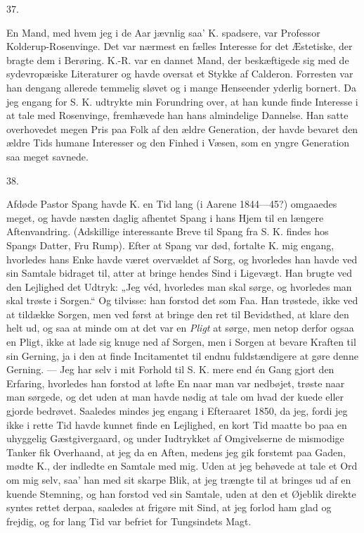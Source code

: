 \documentclass[12pt,a4paper,openany]{book}
\newcommand{\secnum}[1]{\par\begin{center}#1\end{center}\par\nobreak}
\newcommand{\opage}[1]{\marginnote{\footnotesize\textit{[#1]}}}
\begin{document}
\secnum{37.}

En Mand, med hvem jeg i de Aar jævnlig saa’ K.
spadsere, var Professor Kolderup-Rosenvinge. Det var
nærmest en fælles Interesse for det Æstetiske, der bragte
dem i Berøring. K.-R. var en dannet Mand, der beskæftigede
sig med de sydevropæiske Literaturer og havde
oversat et Stykke af Calderon. Forresten var han dengang
allerede temmelig sløvet og i mange Henseender
yderlig bornert. Da jeg engang for S. K. udtrykte min
Forundring over, at han kunde finde Interesse i at tale
med Rosenvinge, fremhævede han hans almindelige Dannelse.
Han satte overhovedet megen Pris paa Folk af
den ældre Generation, der havde bevaret den ældre Tids
humane Interesser og den Finhed i Væsen, som en yngre
Generation saa meget savnede.

\secnum{38.}

Afdøde Pastor Spang havde K. en Tid lang (i Aarene
1844—45?) omgaaedes meget, og havde næsten daglig
afhentet Spang i hans Hjem til en længere Aftenvandring.
(Adskillige interessante Breve til Spang fra S. K. findes
hos Spangs Datter, Fru Rump). Efter at Spang var død,
fortalte K. mig engang, hvorledes hans Enke havde været
overvældet af Sorg, og hvorledes han havde ved sin
\opage{364}Samtale bidraget til, atter at bringe hendes Sind i Ligevægt.
Han brugte ved den Lejlighed det Udtryk: „Jeg
véd, hvorledes man skal sørge, og hvorledes man skal
trøste i Sorgen.“ Og tilvisse: han forstod det som Faa.
Han trøstede, ikke ved at tildække Sorgen, men ved
først at bringe den ret til Bevidsthed, at klare den helt
ud, og saa at minde om at det var en \emph{Pligt} at sørge,
men netop derfor ogsaa en Pligt, ikke at lade sig knuge
ned af Sorgen, men i Sorgen at bevare Kraften til sin
Gerning, ja i den at finde Incitamentet til endnu fuldstændigere
at gøre denne Gerning. — Jeg har selv i mit
Forhold til S. K. mere end én Gang gjort den Erfaring,
hvorledes han forstod at løfte En naar man var nedbøjet,
trøste naar man sørgede, og det uden at man havde
nødig at tale om hvad der kuede eller gjorde bedrøvet.
Saaledes mindes jeg engang i Efteraaret 1850, da jeg,
fordi jeg ikke i rette Tid havde kunnet finde en Lejlighed,
en kort Tid maatte bo paa en uhyggelig Gæstgivergaard,
og under Iudtrykket af Omgivelserne de mismodige Tanker
fik Overhaand, at jeg da en Aften, medens jeg gik forstemt
paa Gaden, mødte K., der indledte en Samtale
med mig. Uden at jeg behøvede at tale et Ord om mig
selv, saa’ han med sit skarpe Blik, at jeg trængte til
at bringes ud af en kuende Stemning, og han forstod
ved sin Samtale, uden at den et Øjeblik direkte syntes
rettet derpaa, saaledes at frigøre mit Sind, at jeg forlod
ham glad og frejdig, og for lang Tid var befriet for
Tungsindets Magt.
\end{document}

